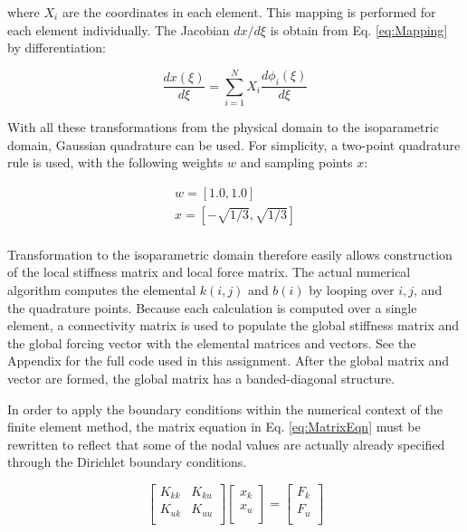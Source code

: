 \documentclass[10pt]{article}
\begin{document}
where \(X_i\) are the coordinates in each element. This mapping is performed for each element individually. The Jacobian \(dx/d\xi\) is obtain from Eq. \eqref{eq:Mapping} by differentiation:

\begin{equation}
\frac{dx(\xi)}{d\xi}=\sum_{i=1}^{N} X_i\frac{d\phi_i(\xi)}{d\xi}
\end{equation}

With all these transformations from the physical domain to the isoparametric domain, Gaussian quadrature can be used. For simplicity, a two-point quadrature rule is used, with the following weights \(w\) and sampling points \(x\):

\begin{equation}
\begin{aligned}
w=[1.0, 1.0]\\
x=[-\sqrt{1/3}, \sqrt{1/3}]\\
\end{aligned}
\end{equation} 

Transformation to the isoparametric domain therefore easily allows construction of the local stiffness matrix and local force matrix. The actual numerical algorithm computes the elemental \(k(i,j)\) and \(b(i)\) by looping over \(i, j\), and the quadrature points. Because each calculation is computed over a single element, a connectivity matrix is used to populate the global stiffness matrix and the global forcing vector with the elemental matrices and vectors. See the Appendix for the full code used in this assignment. After the global matrix and vector are formed, the global matrix has a banded-diagonal structure. 

In order to apply the boundary conditions within the numerical context of the finite element method, the matrix equation in Eq. \eqref{eq:MatrixEqn} must be rewritten to reflect that some of the nodal values are actually already specified through the Dirichlet boundary conditions. 

\begin{equation}
\begin{bmatrix}
	K_{kk} & K_{ku}\\
	K_{uk} & K_{uu}\\
\end{bmatrix}
\begin{bmatrix}
	x_k\\
	x_u\\
\end{bmatrix}
=
\begin{bmatrix}
	F_k\\
	F_u\\
\end{bmatrix}
\end{equation}
\end{document}
